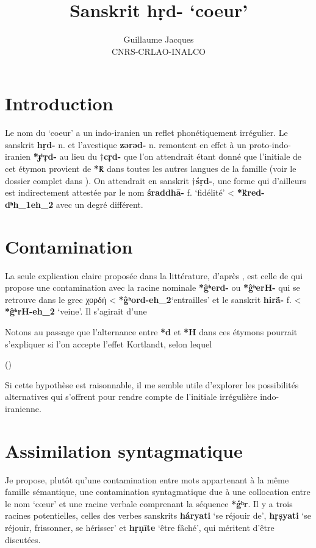\documentclass{article}
\newcommand{\ipa}[1]{{\phon\textbf{#1}}}
\newcommand{\grec}[1]{{\mleccha #1}}
\begin{document}
 
\title{Sanskrit \ipa{hṛd-} `coeur'}
\author{Guillaume Jacques\\ CNRS-CRLAO-INALCO}
\maketitle

\section*{Introduction}
Le nom du `coeur' a un indo-iranien un reflet phonétiquement irrégulier. Le sanskrit \ipa{hṛd-} n. et l'avestique \ipa{zərəd-} n. remontent en effet à un proto-indo-iranien \ipa{*ɟʰṛd-} au lieu du $\dagger$\ipa{cṛd-} que l'on attendrait étant donné que l'initiale de cet étymon provient de \ipa{*ḱ} dans toutes les autres langues de la famille (voir le dossier complet dans \citealt[417-423]{wodtko08NIL}). On attendrait en sanskrit $\dagger$\ipa{śṛd-}, une forme qui d'ailleurs est indirectement attestée par le nom \ipa{śraddhā-} f. `fidélité' < \ipa{*ḱred-dʰh_1eh_2} avec un degré différent.

\section{Contamination}
La seule explication claire proposée dans la littérature, d'après \citet[420]{wodtko08NIL}, est celle de \citet{szemerenyi70heart} qui propose une contamination avec la racine nominale \ipa{*ĝʰerd-} ou \ipa{*ĝʰerH-} qui se retrouve dans le grec \grec{χορδή} < \ipa{*ĝʰord-eh_2}`entrailles' et le sanskrit \ipa{hirā́-} f. < \ipa{*ĝʰrH-eh_2} `veine'. Il s'agirait d'une 

Notons au passage que l'alternance entre \ipa{*d} et \ipa{*H} dans ces étymons pourrait s'expliquer si l'on accepte l'effet Kortlandt, selon lequel 

(\citealt{kortlandt83numerals, garnier14kortlandt})

Si cette hypothèse est raisonnable, il me semble utile d'explorer les possibilités alternatives qui s'offrent pour rendre compte de l'initiale irrégulière indo-iranienne. 



\section{Assimilation syntagmatique}
Je propose, plutôt qu'une contamination entre mots appartenant à la même famille sémantique, une contamination syntagmatique due à une collocation entre le nom `cœur' et une racine verbale comprenant la séquence \ipa{*ǵʰr}. Il y a trois racines potentielles, celles des verbes sanskrits \ipa{háryati} `se réjouir de', \ipa{hṛṣyati} `se réjouir, frissonner, se hérisser' et \ipa{hṛṇīte} `être fâché', qui méritent d'être discutées.
\end{document}
